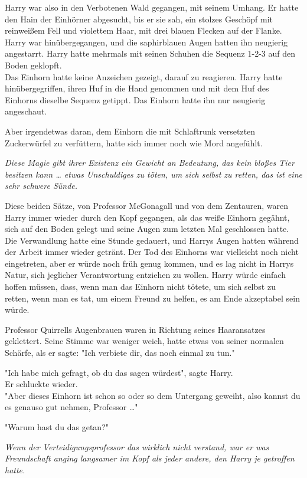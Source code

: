 {Harry war also in den Verbotenen Wald gegangen, mit seinem Umhang. Er hatte den Hain der Einhörner abgesucht, bis er sie sah, ein stolzes Geschöpf mit reinweißem Fell und violettem Haar, mit drei blauen Flecken auf der Flanke. Harry war hinübergegangen, und die saphirblauen Augen hatten ihn neugierig angestarrt. Harry hatte mehrmals mit seinen Schuhen die Sequenz 1-2-3 auf den Boden geklopft.\\ Das Einhorn hatte keine Anzeichen gezeigt, darauf zu reagieren. Harry hatte hinübergegriffen, ihren Huf in die Hand genommen und mit dem Huf des Einhorns dieselbe Sequenz getippt. Das Einhorn hatte ihn nur neugierig angeschaut.

Aber irgendetwas daran, dem Einhorn die mit Schlaftrunk versetzten Zuckerwürfel zu verfüttern, hatte sich immer noch wie Mord angefühlt.

\emph{Diese Magie gibt ihrer Existenz ein Gewicht an Bedeutung, das kein bloßes Tier besitzen kann … etwas Unschuldiges zu töten, um sich selbst zu retten, das ist eine sehr schwere Sünde.}

Diese beiden Sätze, von Professor McGonagall und von dem Zentauren, waren Harry immer wieder durch den Kopf gegangen, als das weiße Einhorn gegähnt, sich auf den Boden gelegt und seine Augen zum letzten Mal geschlossen hatte. Die Verwandlung hatte eine Stunde gedauert, und Harrys Augen hatten während der Arbeit immer wieder getränt. Der Tod des Einhorns war vielleicht noch nicht eingetreten, aber er würde noch früh genug kommen, und es lag nicht in Harrys Natur, sich jeglicher Verantwortung entziehen zu wollen. Harry würde einfach hoffen müssen, dass, wenn man das Einhorn nicht tötete, um sich selbst zu retten, wenn man es tat, um einem Freund zu helfen, es am Ende akzeptabel sein würde.

Professor Quirrells Augenbrauen waren in Richtung seines Haaransatzes geklettert. Seine Stimme war weniger weich, hatte etwas von seiner normalen Schärfe, als er sagte: "Ich verbiete dir, das noch einmal zu tun."

"Ich habe mich gefragt, ob du das sagen würdest", sagte Harry.\\ Er schluckte wieder.\\ "Aber dieses Einhorn ist schon so oder so dem Untergang geweiht, also kannst du es genauso gut nehmen, Professor …"

"Warum hast du das getan?"

\emph{Wenn der Verteidigungsprofessor das wirklich nicht verstand, war er was Freundschaft anging langsamer im Kopf als jeder andere, den Harry je getroffen hatte.}

}
